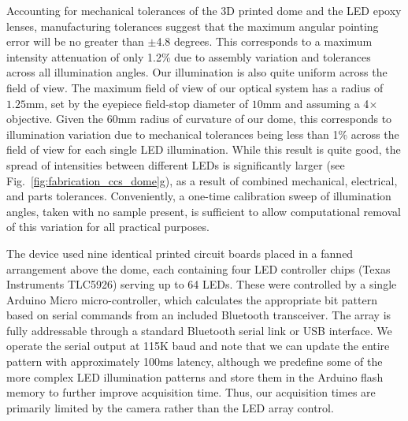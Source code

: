 Accounting for mechanical tolerances of the 3D printed dome and the LED epoxy lenses, manufacturing tolerances suggest that the maximum angular pointing error will be no greater than $\pm$4.8 degrees. This corresponds to a maximum intensity attenuation of only 1.2\% due to assembly variation and tolerances across all illumination angles. Our illumination is also quite uniform across the field of view. The maximum field of view of our optical system has a radius of $1.25\textrm{mm}$, set by the eyepiece field-stop diameter of $10\textrm{mm}$ and assuming a 4$\times$ objective. Given the $60\textrm{mm}$ radius of curvature of our dome, this corresponds to illumination variation due to mechanical tolerances being less than 1\% across the field of view for each single LED illumination.  While this result is quite good, the spread of intensities between different LEDs is significantly larger (see Fig.~\ref{fig:fabrication_ccs_dome}g), as a result of combined mechanical, electrical, and parts tolerances. Conveniently, a one-time calibration sweep of illumination angles, taken with no sample present, is sufficient to allow computational removal of this variation for all practical purposes.

The device used nine identical printed circuit boards placed in a fanned arrangement above the dome, each containing four LED controller chips (Texas Instruments TLC5926) serving up to 64 LEDs. These were controlled by a single Arduino Micro micro-controller, which calculates the appropriate bit pattern based on serial commands from an included Bluetooth transceiver. The array is fully addressable through a standard Bluetooth serial link or USB interface. We operate the serial output at 115K baud and note that we can update the entire pattern with approximately 100ms latency, although we predefine some of the more complex LED illumination patterns and store them in the Arduino flash memory to further improve acquisition time. Thus, our acquisition times are primarily limited by the camera rather than the LED array control.


